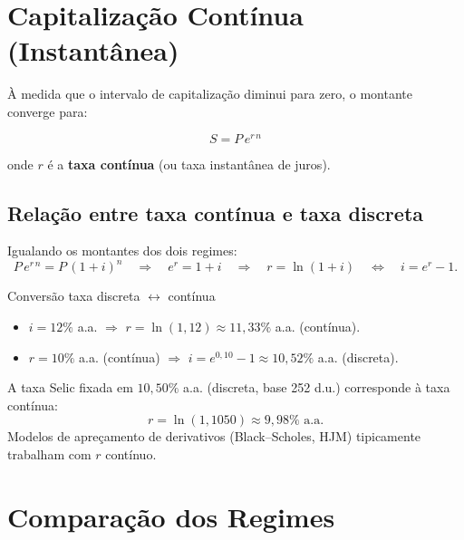 \section{Capitalização Contínua (Instantânea)}

À medida que o intervalo de capitalização diminui para zero, o montante converge para:
\begin{resultado}
\[
  \boxed{S = P\,e^{r\,n}}
\]
\end{resultado}
onde $r$ é a \textbf{taxa contínua} (ou taxa instantânea de juros).

\subsection*{Relação entre taxa contínua e taxa discreta}

Igualando os montantes dos dois regimes:
\[
  P\,e^{r\,n} = P\,(1+i)^n
  \quad\Rightarrow\quad
  e^r = 1+i
  \quad\Rightarrow\quad
  \boxed{r = \ln(1+i)}
  \quad\Leftrightarrow\quad
  \boxed{i = e^r - 1.}
\]

\begin{exemplo}{Conversão taxa discreta $\leftrightarrow$ contínua}
\begin{itemize}
  \item $i = 12\%$ a.a. $\Rightarrow$ $r = \ln(1{,}12) \approx 11{,}33\%$ a.a. (contínua).
  \item $r = 10\%$ a.a. (contínua) $\Rightarrow$ $i = e^{0{,}10}-1 \approx 10{,}52\%$ a.a. (discreta).
\end{itemize}
\end{exemplo}

\begin{moderno}[title={Taxa Selic em capitalização contínua (2024)}]
A taxa Selic fixada em $10{,}50\%$ a.a. (discreta, base 252 d.u.) corresponde à taxa contínua:
\[
  r = \ln(1{,}1050) \approx 9{,}98\% \text{ a.a.}
\]
Modelos de apreçamento de derivativos (Black--Scholes, HJM) tipicamente trabalham com $r$ contínuo.
\end{moderno}

\section{Comparação dos Regimes}

